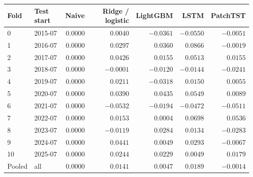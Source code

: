 \begin{tabular}{llrrrrr}
\toprule
Fold & Test start & Naive & Ridge / logistic & LightGBM & LSTM & PatchTST \\
\midrule
0 & 2015-07 & $0.0000$ & $0.0040$ & $-0.0361$ & $-0.0550$ & $-0.0051$ \\
1 & 2016-07 & $0.0000$ & $0.0297$ & $0.0360$ & $0.0866$ & $-0.0019$ \\
2 & 2017-07 & $0.0000$ & $0.0426$ & $0.0155$ & $0.0513$ & $0.0155$ \\
3 & 2018-07 & $0.0000$ & $-0.0001$ & $-0.0120$ & $-0.0144$ & $-0.0241$ \\
4 & 2019-07 & $0.0000$ & $0.0211$ & $-0.0318$ & $0.0150$ & $0.0055$ \\
5 & 2020-07 & $0.0000$ & $0.0390$ & $0.0435$ & $0.0549$ & $0.0089$ \\
6 & 2021-07 & $0.0000$ & $-0.0532$ & $-0.0194$ & $-0.0472$ & $-0.0511$ \\
7 & 2022-07 & $0.0000$ & $0.0153$ & $0.0004$ & $0.0698$ & $0.0536$ \\
8 & 2023-07 & $0.0000$ & $-0.0119$ & $0.0284$ & $0.0134$ & $-0.0283$ \\
9 & 2024-07 & $0.0000$ & $0.0441$ & $0.0049$ & $0.0293$ & $-0.0067$ \\
10 & 2025-07 & $0.0000$ & $0.0244$ & $0.0229$ & $0.0049$ & $0.0179$ \\
\midrule Pooled & all & $0.0000$ & $0.0141$ & $0.0047$ & $0.0189$ & $-0.0014$ \\
\bottomrule
\end{tabular}
